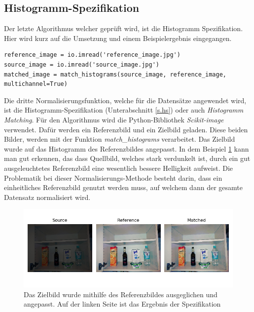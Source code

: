 \subsection{Histogramm-Spezifikation}
Der letzte Algorithmus welcher geprüft wird, ist die Histogramm Spezifikation. Hier wird kurz auf die Umsetzung und einem Beispielergebnis eingegangen.\\
\begin{lstlisting}
reference_image = io.imread('reference_image.jpg')
source_image = io.imread('source_image.jpg')
matched_image = match_histograms(source_image, reference_image, multichannel=True)
\end{lstlisting}
Die dritte Normalisierungsfunktion, welche für die Datensätze angewendet wird, ist die Histogramm-Spezifikation (Unterabschnitt \ref{s.hs}) oder auch \textit{Histogramm Matching}. Für den Algorithmus wird die Python-Bibliothek \textit{Scikit-image} verwendet. Dafür werden ein Referenzbild und ein Zielbild geladen. Diese beiden Bilder, werden mit der Funktion \textit{match\_histograms} verarbeitet. Das Zielbild wurde auf das Histogramm des Referenzbildes angepasst. In dem Beispiel \ref{img:histogramspez} kann man gut erkennen, das dass Quellbild, welches stark verdunkelt ist, durch ein gut ausgeleuchtetes Referenzbild eine wesentlich bessere Helligkeit aufweist. Die Problematik bei dieser Normalisierungs-Methode besteht darin, dass ein einheitliches Referenzbild genutzt werden muss, auf welchem dann der gesamte Datensatz normalisiert wird.
\begin{figure}
	[h]
	\centering
	\includegraphics[scale=0.6]{Sources/HS_beispiel.png}
	\caption{Das Zielbild wurde mithilfe des Referenzbildes ausgeglichen und angepasst. Auf der linken Seite ist das Ergebnis der Spezifikation}
	\label{img:histogramspez}
\end{figure}